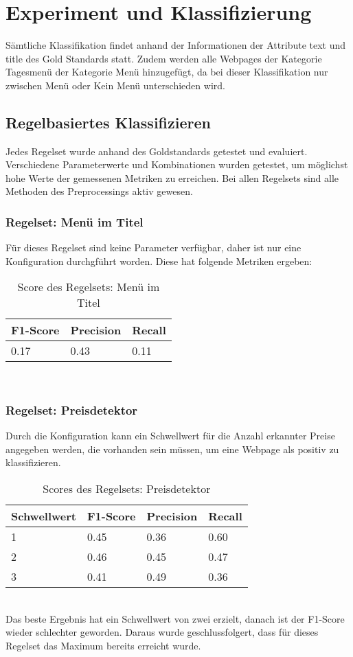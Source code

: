 \chapter{Experiment und Klassifizierung}
Sämtliche Klassifikation findet anhand der Informationen der Attribute \glqq text \grqq und \glqq title \grqq des Gold Standards statt.
Zudem werden alle Webpages der Kategorie \glqq Tagesmenü \grqq der Kategorie \glqq Menü \grqq hinzugefügt, da bei dieser Klassifikation nur zwischen \glqq Menü \grqq oder \glqq Kein Menü \grqq unterschieden wird.
\section{Regelbasiertes Klassifizieren}
Jedes Regelset wurde anhand des Goldstandards getestet und evaluiert.
Verschiedene Parameterwerte und Kombinationen wurden getestet, um möglichst hohe Werte der gemessenen Metriken zu erreichen.
Bei allen Regelsets sind alle Methoden des Preprocessings aktiv gewesen. 
\subsection{Regelset: Menü im Titel}
Für dieses Regelset sind keine Parameter verfügbar, daher ist nur eine Konfiguration durchgführt worden.
Diese hat folgende Metriken ergeben:\\
\begin{table}
\caption{Score des Regelsets: Menü im Titel}
\centering
\begin{tabular}{|l|l|l|}
	\hline
	F1-Score & Precision & Recall\\
	\hline
	0.17 & 0.43 & 0.11  \\
	\hline
\end{tabular}
\end{table}\\
\subsection{Regelset: Preisdetektor}
Durch die Konfiguration kann ein Schwellwert für die Anzahl erkannter Preise angegeben werden, die vorhanden sein müssen, um eine Webpage als positiv zu klassifizieren.\\
\begin{table}
\caption{Scores des Regelsets: Preisdetektor}
\centering
\begin{tabular}{|l|l|l|l|}
	\hline
	Schwellwert & F1-Score & Precision & Recall\\
	\hline
	1 & 0.45 & 0.36 & 0.60  \\
	2 & 0.46 & 0.45 & 0.47 \\
	3 & 0.41 & 0.49 & 0.36 \\
	\hline
\end{tabular}
\end{table}\\
Das beste Ergebnis hat ein Schwellwert von zwei erzielt, danach ist der F1-Score wieder schlechter geworden.
Daraus wurde geschlussfolgert, dass für dieses Regelset das Maximum bereits erreicht wurde.
